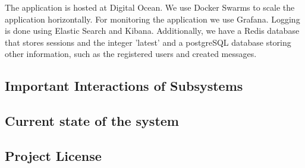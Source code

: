 The application is hosted at Digital Ocean. We use Docker Swarms to scale the application horizontally. For 
monitoring the application we use Grafana. Logging is done using Elastic Search and Kibana. Additionally, we have a Redis database 
that stores sessions and the integer 'latest' and a postgreSQL database storing other information, such as 
the registered users and created messages. 

\subsection{Important Interactions of Subsystems}

\subsection{Current state of the system}

\subsection{Project License}